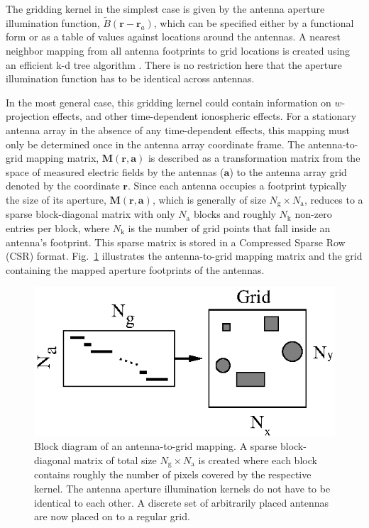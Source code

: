 \documentclass[a4paper,fleqn,usenatbib]{mnras}
\newcommand{\Nant}{N_\textrm{a}}
\newcommand{\Ngrid}{N_\textrm{g}}
\begin{document}
The gridding kernel in the simplest case is given by the antenna aperture
illumination function, $\widetilde{B}(\mathbf{r}-\mathbf{r}_a)$, which can
be specified either by a functional form or as a table of values against 
locations around the antennas. A nearest neighbor mapping from all antenna 
footprints to grid locations is created using an efficient k-d tree algorithm 
\citep{man99}. There is no restriction here that the aperture illumination 
function has to be identical across antennas. 

In the most general case, this gridding kernel could contain information on
$w$-projection effects, and other time-dependent ionospheric effects. For a
stationary antenna array in the absence of any time-dependent effects, this
mapping must only be determined once in the antenna array coordinate frame. The
antenna-to-grid mapping matrix, $\mathbf{M}(\mathbf{r},\mathbf{a})$ is described
as a transformation matrix from the space of measured electric fields by the 
antennas ($\mathbf{a}$) to the antenna array grid denoted by the coordinate 
$\mathbf{r}$. Since each antenna occupies a footprint typically the size of its 
aperture, $\mathbf{M}(\mathbf{r},\mathbf{a})$, which is generally of size
$\Ngrid\times \Nant$, reduces to a sparse block-diagonal matrix
with only $\Nant$ blocks and roughly $N_\textrm{k}$ non-zero entries per
block, where $N_\textrm{k}$ is the number of grid points that fall inside an
antenna's footprint. This sparse matrix is stored in a Compressed Sparse Row 
(CSR) format. Fig.~\ref{fig:a2g-mapping} illustrates the antenna-to-grid mapping
matrix and the grid containing the mapped aperture footprints of the antennas.

\begin{figure}
  \includegraphics[width=\columnwidth]{figure3}
  \caption{Block diagram of an antenna-to-grid mapping. A sparse block-diagonal
    matrix of total size $\Ngrid\times \Nant$ is created where each
    block contains roughly the number of pixels covered by the respective kernel.
    The antenna aperture illumination kernels do not have to be identical to each
    other. A discrete set of arbitrarily placed antennas are now placed on to a
    regular grid.}
  \label{fig:a2g-mapping}
\end{figure}
\end{document}

